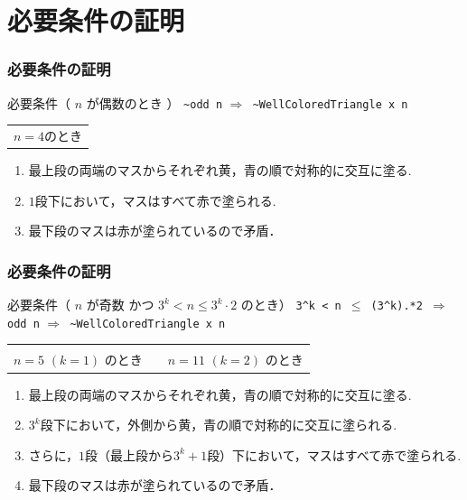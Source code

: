 \documentclass[dvipdfmx,cjk]{beamer}
\begin{document}
\section{必要条件の証明}

\begin{frame}[fragile]
  \frametitle{必要条件の証明}
  \begin{block}{必要条件（ $n$ が偶数のとき ）}
    \color{red}
    {\tt{\verb|~|odd n}}
    \color{black}
    {\tt{$\Rightarrow$ \verb|~|WellColoredTriangle x n}}
  \end{block}
  {\small
    \vfill
    \begin{center}
      \begin{tabular}{c}
        
        \\
        $n=4$のとき
      \end{tabular}
    \end{center}
    \begin{enumerate}
    \item
      最上段の両端のマスからそれぞれ黄，青の順で対称的に交互に塗る.
    \item
      $1$段下において，マスはすべて赤で塗られる.
    \item
      最下段のマスは赤が塗られているので矛盾．
    \end{enumerate}
  } 
\end{frame}

\begin{frame}[fragile]
  \frametitle{必要条件の証明}
  \begin{block}{必要条件（ $n$ が奇数 かつ $3^k < n \leq 3^k \cdot 2$ のとき）}
    \color{red}
    {\tt{3\verb|^|k < n $\leq$ (3\verb|^|k).*2 $\Rightarrow$ odd n}}
    \color{black}
    {\tt{$\Rightarrow$ \verb|~|WellColoredTriangle x n}} 
  \end{block}
  {\footnotesize
    \vfill
    \begin{center}
      \begin{tabular}{ccc}
        
        &
        \hfill
        &
        
        \\
        $n=5$ $(k=1)$ のとき
        &
        \hfill
        &
        $n=11$ $(k=2)$ のとき
      \end{tabular}
    \end{center}
    \begin{enumerate}
    \item
      最上段の両端のマスからそれぞれ黄，青の順で対称的に交互に塗る.
    \item
      $3^k$段下において，外側から黄，青の順で対称的に交互に塗られる.
    \item
      さらに，$1$段（最上段から$3^k + 1$段）下において，マスはすべて赤で塗られる.
    \item
      最下段のマスは赤が塗られているので矛盾．
    \end{enumerate}
  } 
\end{frame}
\end{document}
